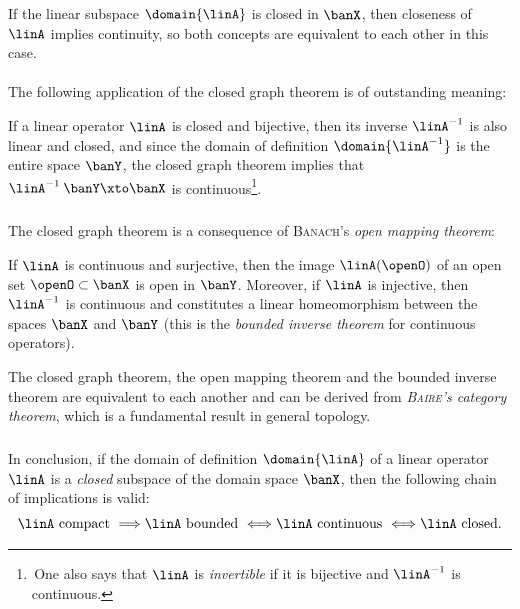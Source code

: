 \documentclass[11pt,twoside]{article}
\begin{document}
\begin{theorem1}\label{CLOSED_GRAPH_THEOREM}
If the linear subspace $\domain{\linA}$ is closed in $\banX$,
then closeness of $\linA$ implies continuity,
so both concepts are equivalent to each other in this case.
\end{theorem1}

\paragraph{} %
The following application of the closed graph theorem
is of outstanding meaning:

\begin{theorem1}\label{BOUNDED_INVERSE_THEOREM}
If a linear operator $\linA$ is closed and bijective,
then its inverse $\linA^{-1}$ is also linear and closed,
and since the domain of definition $\domain{\linA^{-1}}$
is the entire space $\banY$,
the closed graph theorem implies that $\linA^{-1} \: \banY \xto \banX$
is continuous\footnote{
\,One also says that $\linA$ is \textit{invertible}
if it is bijective and $\linA^{-1}$ is continuous.}.
\end{theorem1}

\subparagraph{} %
The closed graph theorem is a consequence of
\textsc{Banach}'s \textit{open mapping theorem}:

\begin{theorem1}\label{OPEN_MAPPING_THEOREM}
If $\linA$ is continuous and surjective,
then the image $\linA(\openO)$ of an open set $\openO \subset \banX$
is open in $\banY$.
Moreover,
if $\linA$ is injective,
then $\linA^{-1}$ is continuous
and constitutes a linear homeomorphism between the spaces $\banX$ and $\banY$
(this is the \textit{bounded inverse theorem} for continuous operators).
\end{theorem1}

The closed graph theorem,
the open mapping theorem and
the bounded inverse theorem
are equivalent to each another
and can be derived from \textit{\textsc{Baire}'s category theorem},
which is a fundamental result in general topology.

\subparagraph{} %
In conclusion,
if the domain of definition $\domain{\linA}$ of a linear operator $\linA$
is a \textit{closed} subspace of the domain space $\banX$,
then the following chain of implications is valid:
\[
\linA \mbox{ compact }     \Longrightarrow
\linA \mbox{ bounded }     \Longleftrightarrow
\linA \mbox{ continuous }  \Longleftrightarrow
\linA \mbox{ closed}.     %
\]
\end{document}
